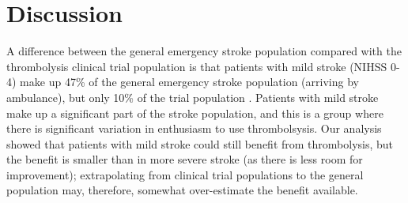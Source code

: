 \section{Discussion}


A difference between the general emergency stroke population compared with the thrombolysis clinical trial population is that patients with mild stroke (NIHSS 0-4) make up 47\% of the general emergency stroke population (arriving by ambulance), but only 10\% of the trial population \cite{emberson_effect_2014}. Patients with mild stroke make up a significant part of the stroke population, and this is a group where there is significant variation in enthusiasm to use thrombolsysis. Our analysis showed that patients with mild stroke could still benefit from thrombolysis, but the benefit is smaller than in more severe stroke (as there is less room for improvement); extrapolating from clinical trial populations to the general population may, therefore, somewhat over-estimate the benefit available.

